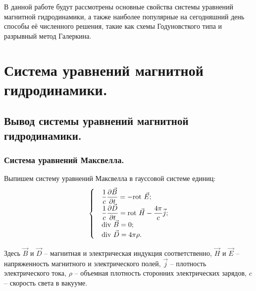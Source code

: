 \documentclass[14pt, a4paper, fleqn]{extreport}
\begin{document}
	В данной работе будут рассмотрены основные свойства 
	системы уравнений магнитной гидродинамики,
	а также наиболее популярные на сегодняшний день способы её численного решения,
	такие как схемы Годуновсткого типа и разрывный метод Галеркина.
		
	\chapter{Система уравнений магнитной гидродинамики.}
	
	\section{Вывод системы уравнений магнитной гидродинамики.}
	
	\subsection{Система уравнений Максвелла.}
	
	Выпишем систему уравнений Максвелла в гауссовой системе единиц:
	\begin{equation} \label{maxwellEqs}
	\begin{cases}
	&\dfrac{1}{c}\dfrac{\partial\vec{B}}{\partial t} = 
	-\text{rot }{\vec{E}};
	\\
	&\dfrac{1}{c}\dfrac{\partial\vec{D}}{\partial t} =
	\text{rot }{\vec{H}} - \dfrac{4\pi}{c}\vec{j};
	\\
	&\text{div }{\vec{B}} = 0;
	\\
	&\text{div }{\vec{D}} = 4\pi\rho.
	\end{cases}
	\end{equation}
	
	Здесь 
	$\vec{B}$ и $\vec{D}$ -- магнитная и электрическая индукция соответственно, 
	$\vec{H}$ и $\vec{E}$ -- напряженность магнитного и электрического полей,
	$\vec{j}$ -- плотность электрического тока,
	$\rho$ -- объемная плотность сторонних электрических зарядов,
	$c$ -- скорость света в вакууме.
	
\end{document}

